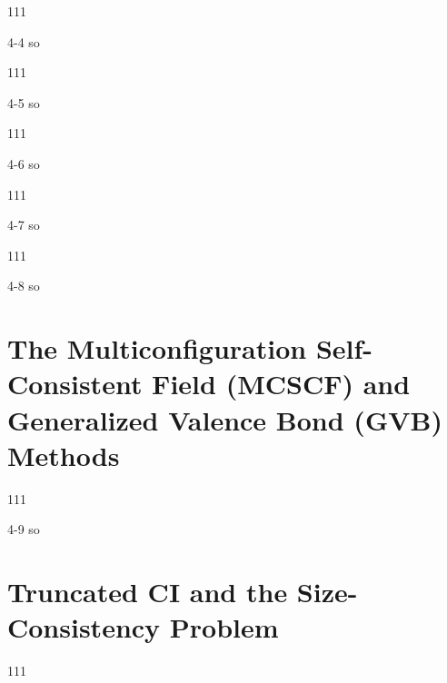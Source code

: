 \documentclass[a4paper]{book}
\begin{document}
	\begin{exercise}
	111
	\end{exercise}
	
	\begin{solution}
		4-4 so
	\end{solution}
	
	\begin{exercise}
	111
	\end{exercise}
	
	\begin{solution}
		4-5 so
	\end{solution}
	
	\begin{exercise}
	111
	\end{exercise}
	
	\begin{solution}
		4-6 so
	\end{solution}
	
	\begin{exercise}
	111
	\end{exercise}
	
	\begin{solution}
		4-7 so
	\end{solution}
	
	\begin{exercise}
	111
	\end{exercise}
	
	\begin{solution}
		4-8 so
	\end{solution}
	
	\section{The Multiconfiguration Self-Consistent Field (MCSCF) and \texorpdfstring{\\}- Generalized Valence Bond (GVB) Methods}
	
	\begin{exercise}
	111
	\end{exercise}
	
	\begin{solution}
		4-9 so
	\end{solution}
	
	\section{Truncated CI and the Size-Consistency Problem}	
	
	\begin{exercise}
	111
	\end{exercise}
	
\end{document}
